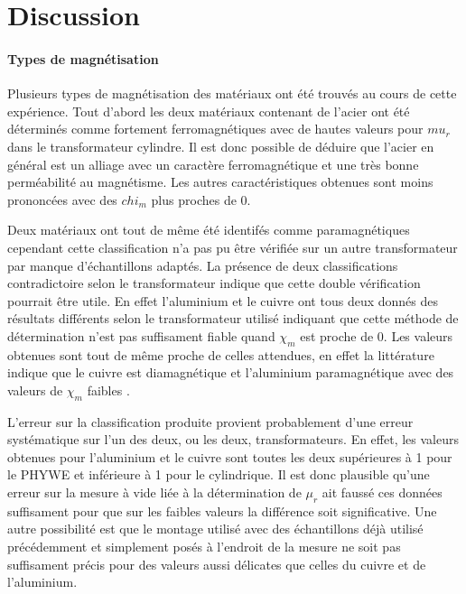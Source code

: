 \section{Discussion}


\paragraph*{Types de magnétisation}
Plusieurs types de magnétisation des matériaux ont été trouvés au cours de cette expérience. Tout d'abord les deux matériaux contenant de l'acier ont été déterminés comme fortement ferromagnétiques avec de hautes valeurs pour \(mu_r\) dans le transformateur cylindre. Il est donc possible de déduire que l'acier en général est un alliage avec un caractère ferromagnétique et une très bonne perméabilité au magnétisme. Les autres caractéristiques obtenues sont moins prononcées avec des \(chi_m\) plus proches de 0. 

Deux matériaux ont tout de même été identifés comme paramagnétiques cependant cette classification n'a pas pu être vérifiée sur un autre transformateur par manque d'échantillons adaptés. La présence de deux classifications contradictoire selon le transformateur indique que cette double vérification pourrait être utile. En effet l'aluminium et le cuivre ont tous deux donnés des résultats différents selon le transformateur utilisé indiquant que cette méthode de détermination n'est pas suffisament fiable quand \(\chi_m\) est proche de 0. Les valeurs obtenues sont tout de même proche de celles attendues, en effet la littérature indique que le cuivre est diamagnétique et l'aluminium paramagnétique avec des valeurs de \(\chi_m\) faibles \cite{classification_litt}. 

L'erreur sur la classification produite provient probablement d'une erreur systématique sur l'un des deux, ou les deux, transformateurs. En effet, les valeurs obtenues pour l'aluminium et le cuivre sont toutes les deux supérieures à 1 pour le PHYWE et inférieure à 1 pour le cylindrique. Il est donc plausible qu'une erreur sur la mesure à vide liée à la détermination de \(\mu_r\) ait faussé ces données suffisament pour que sur les faibles valeurs la différence soit significative. Une autre possibilité est que le montage utilisé avec des échantillons déjà utilisé précédemment et simplement posés à l'endroit de la mesure ne soit pas suffisament précis pour des valeurs aussi délicates que celles du cuivre et de l'aluminium.







